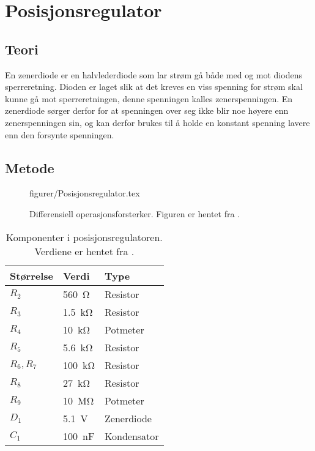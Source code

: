 \section{Posisjonsregulator}\label{sec:posisjonsregulator}

\subsection{Teori}


En zenerdiode er en halvlederdiode som lar strøm gå både med og mot diodens sperreretning. 
Dioden er laget slik at det kreves en viss spenning for strøm skal kunne gå mot sperreretningen, denne spenningen kalles zenerspenningen.
En zenerdiode sørger derfor for at spenningen over seg ikke blir noe høyere enn zenerspenningen sin, og kan derfor brukes til å holde en konstant spenning lavere enn den forsynte spenningen\cite{Zenerdiode}.





\subsection{Metode}

\begin{figure} [h]
    \centering
     {figurer/Posisjonsregulator.tex}
    \caption{Differensiell operasjonsforsterker. Figuren er hentet fra \cite{AnalogMotorlabbOppgaver}.}
    \label{fig:Posisjonsregulator}
\end{figure}

\begin{table}[h]
    \centering
    \caption{Komponenter i posisjonsregulatoren. Verdiene er hentet fra \cite{AnalogMotorlabbOppgaver}.}
    \begin{tabular}{lll}
        \toprule
		Størrelse & Verdi & Type \\
		\midrule
        $R_2$ & \SI{560}{\ohm} & Resistor \\
        $R_3$ & \SI{1.5}{\kilo\ohm} & Resistor\\
        $R_4$ & \SI{10}{\kilo\ohm} & Potmeter\\
        $R_5$ & \SI{5.6}{\kilo\ohm} & Resistor\\
        $R_6, R_7$ & \SI{100}{\kilo\ohm} & Resistor\\
        $R_8$ & \SI{27}{\kilo\ohm} & Resistor\\
        $R_9$ & \SI{10}{\mega\ohm} & Potmeter\\
        $D_1$ & \SI{5.1}{\volt} & Zenerdiode\\
        $C_1$ & \SI{100}{\nano\farad} & Kondensator\\
		\bottomrule
    \end{tabular}
    \label{tab:Posisjonsregulator}
\end{table}

